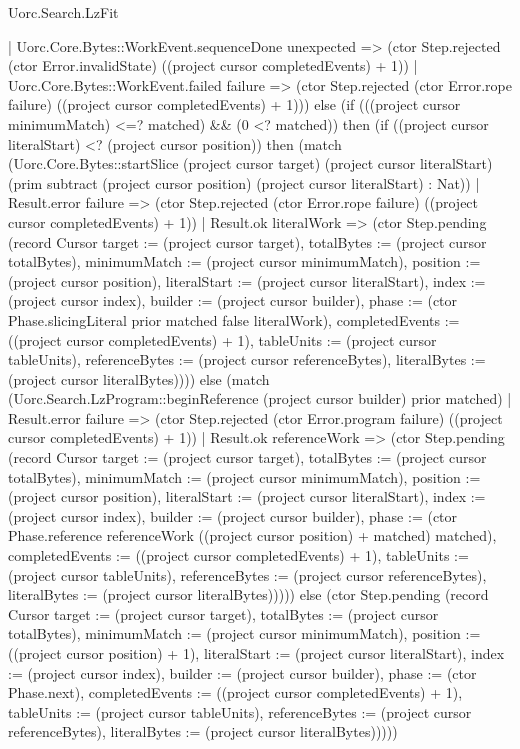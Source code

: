 \begin{lexlean}{Uorc.Search.LzFit}
\begin{semanticmodule}
{      | Uorc.Core.Bytes::WorkEvent.sequenceDone unexpected => (ctor Step.rejected (ctor Error.invalidState) ((project cursor completedEvents) + 1))
      | Uorc.Core.Bytes::WorkEvent.failed failure => (ctor Step.rejected (ctor Error.rope failure) ((project cursor completedEvents) + 1))) else (if (((project cursor minimumMatch) <=? matched) && (0 <? matched)) then (if ((project cursor literalStart) <? (project cursor position)) then (match (Uorc.Core.Bytes::startSlice (project cursor target) (project cursor literalStart) (prim subtract (project cursor position) (project cursor literalStart) : Nat))
      | Result.error failure => (ctor Step.rejected (ctor Error.rope failure) ((project cursor completedEvents) + 1))
      | Result.ok literalWork => (ctor Step.pending (record Cursor {target := (project cursor target), totalBytes := (project cursor totalBytes), minimumMatch := (project cursor minimumMatch), position := (project cursor position), literalStart := (project cursor literalStart), index := (project cursor index), builder := (project cursor builder), phase := (ctor Phase.slicingLiteral prior matched false literalWork), completedEvents := ((project cursor completedEvents) + 1), tableUnits := (project cursor tableUnits), referenceBytes := (project cursor referenceBytes), literalBytes := (project cursor literalBytes)}))) else (match (Uorc.Search.LzProgram::beginReference (project cursor builder) prior matched)
      | Result.error failure => (ctor Step.rejected (ctor Error.program failure) ((project cursor completedEvents) + 1))
      | Result.ok referenceWork => (ctor Step.pending (record Cursor {target := (project cursor target), totalBytes := (project cursor totalBytes), minimumMatch := (project cursor minimumMatch), position := (project cursor position), literalStart := (project cursor literalStart), index := (project cursor index), builder := (project cursor builder), phase := (ctor Phase.reference referenceWork ((project cursor position) + matched) matched), completedEvents := ((project cursor completedEvents) + 1), tableUnits := (project cursor tableUnits), referenceBytes := (project cursor referenceBytes), literalBytes := (project cursor literalBytes)})))) else (ctor Step.pending (record Cursor {target := (project cursor target), totalBytes := (project cursor totalBytes), minimumMatch := (project cursor minimumMatch), position := ((project cursor position) + 1), literalStart := (project cursor literalStart), index := (project cursor index), builder := (project cursor builder), phase := (ctor Phase.next), completedEvents := ((project cursor completedEvents) + 1), tableUnits := (project cursor tableUnits), referenceBytes := (project cursor referenceBytes), literalBytes := (project cursor literalBytes)}))))
}
\end{semanticmodule}
\end{lexlean}
